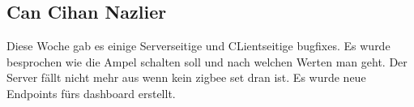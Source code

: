 \documentclass[]{article}
\begin{document}
\subsection{Can Cihan Nazlier}
Diese Woche gab es einige Serverseitige und CLientseitige bugfixes. Es wurde besprochen wie die Ampel schalten soll und nach welchen Werten man geht. Der Server fällt nicht mehr aus wenn kein zigbee set dran ist. Es wurde neue Endpoints fürs dashboard erstellt.

\printbibliography
\end{document}
